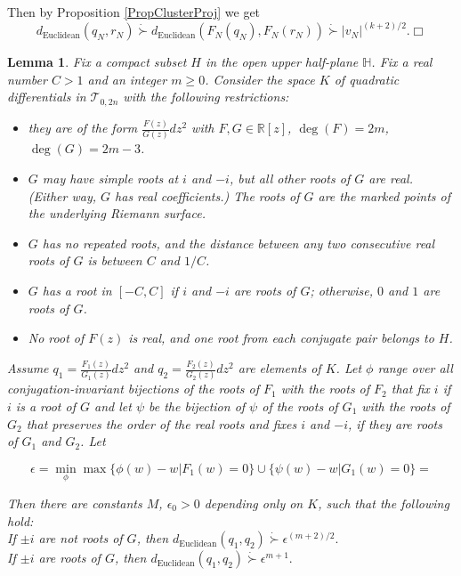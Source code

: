 \documentclass[12pt]{article}
\newtheorem{lemma}[theorem]{Lemma}
\newcommand{\rr}{\mathbb{R}}
\begin{document}
\noindent Then by Proposition \ref{PropClusterProj} we get $$d_\mathrm{Euclidean}(q_N,r_N) \dot{\succ} d_\mathrm{Euclidean}(F_N(q_N),F_N(r_N)) \dot{\succ} |v_N|^{(k+2)/2}. \Box$$

\begin{lemma}\label{LemmaImplant} Fix a compact subset $H$ in the open upper half-plane $\mathbb{H}$. Fix a real number $C > 1$ and an integer $m \geq 0$. Consider the space $K$ of quadratic differentials in $\mathcal{T}_{0,2n}$ with the following restrictions:

\begin{itemize}
\item they are of the form $\frac{F(z)}{G(z)}dz^2$ with $F,G \in \rr[z]$, $\deg(F) = 2m$, $\deg(G) = 2m - 3$.
\item $G$ may have simple roots at $i$ and $-i$, but all other roots of $G$ are real. (Either way, $G$ has real coefficients.) The roots of $G$ are the marked points of the underlying Riemann surface.
\item $G$ has no repeated roots, and the distance between any two consecutive real roots of $G$ is between $C$ and $1/C$.
\item $G$ has a root in $[-C,C]$ if $i$ and $-i$ are roots of $G$; otherwise, $0$ and $1$ are roots of $G$.
\item No root of $F(z)$ is real, and one root from each conjugate pair belongs to $H$.\\
\end{itemize}

Assume $q_1 = \frac{F_1(z)}{G_1(z)}dz^2$ and $q_2 = \frac{F_2(z)}{G_2(z)}dz^2$ are elements of $K$. Let $\phi$ range over all conjugation-invariant bijections of the roots of $F_1$ with the roots of $F_2$ that fix $i$ if $i$ is a root of $G$ and let $\psi$ be the bijection of $\psi$ of the roots of $G_1$ with the roots of $G_2$ that preserves the order of the real roots and fixes $i$ and $-i$, if they are roots of $G_1$ and $G_2$. Let

$$\epsilon = \min\limits_{\phi}\max\{\phi(w) - w| F_1(w) = 0\}\cup \{\psi(w) - w| G_1(w) = 0\} = $$

Then there are constants $M$, $\epsilon_0 > 0$ depending only on $K$, such that the following hold:\\

If $\pm i$ are not roots of $G$, then $d_\mathrm{Euclidean}(q_1,q_2) \dot{\succ} \epsilon^{(m+2)/2}.$\\

If $\pm i$ are roots of $G$, then $d_\mathrm{Euclidean}(q_1,q_2) \dot{\succ} \epsilon^{m+1}.$
\end{lemma}
\end{document}
